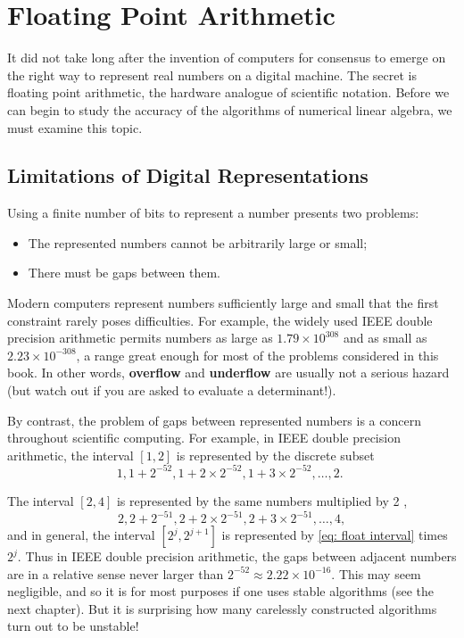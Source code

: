 \chapter{Floating Point Arithmetic}

It did not take long after the invention of computers for consensus to emerge on the right way to represent real numbers on a digital machine. The secret is floating point arithmetic, the hardware analogue of scientific notation. Before we can begin to study the accuracy of the algorithms of numerical linear algebra, we must examine this topic.

\section{Limitations of Digital Representations} 
Using a finite number of bits to  represent a number presents two problems: 
\begin{itemize}
    \item The represented numbers cannot be arbitrarily large or small;
    \item There must be gaps between them. 
\end{itemize}

Modern computers represent numbers sufficiently large and small that the first constraint rarely poses difficulties. For example, the widely used IEEE double precision arithmetic permits numbers as large as $1.79 \times 10^{308}$ and as small as $2.23 \times 10^{-308}$, a range great enough for most of the problems considered in this book. In other words, \textbf{overflow} and \textbf{underflow} are usually not a serious hazard (but watch out if you are asked to evaluate a determinant!). 

By contrast, the problem of gaps between represented numbers is a concern throughout scientific computing. For example, in IEEE double precision arithmetic, the interval $[1,2]$ is represented by the discrete subset
\begin{equation}
    \label{eq: float interval}
    1,1+2^{-52}, 1+2 \times 2^{-52}, 1+3 \times 2^{-52}, \ldots, 2 \text {. } 
\end{equation}


The interval $[2,4]$ is represented by the same numbers multiplied by 2 ,
$$
2,2+2^{-51}, 2+2 \times 2^{-51}, 2+3 \times 2^{-51}, \ldots, 4,
$$
and in general, the interval $\left[2^j, 2^{j+1}\right]$ is represented by \autoref{eq: float interval} times $2^j$. Thus in IEEE double precision arithmetic, the gaps between adjacent numbers are in a relative sense never larger than $2^{-52} \approx 2.22 \times 10^{-16}$. This may seem negligible, and so it is for most purposes if one uses stable algorithms (see the next chapter). But it is surprising how many carelessly constructed algorithms turn out to be unstable!

